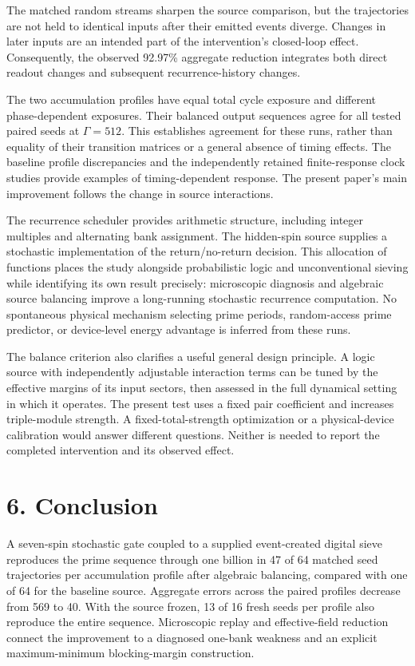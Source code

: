 \documentclass[
  11pt,
]{article}
\begin{document}
The matched random streams sharpen the source comparison, but the
trajectories are not held to identical inputs after their emitted events
diverge. Changes in later inputs are an intended part of the
intervention's closed-loop effect. Consequently, the observed 92.97\%
aggregate reduction integrates both direct readout changes and
subsequent recurrence-history changes.

The two accumulation profiles have equal total cycle exposure and
different phase-dependent exposures. Their balanced output sequences
agree for all tested paired seeds at \(\Gamma=512\). This establishes
agreement for these runs, rather than equality of their transition
matrices or a general absence of timing effects. The baseline profile
discrepancies and the independently retained finite-response clock
studies provide examples of timing-dependent response. The present
paper's main improvement follows the change in source interactions.

The recurrence scheduler provides arithmetic structure, including
integer multiples and alternating bank assignment. The hidden-spin
source supplies a stochastic implementation of the return/no-return
decision. This allocation of functions places the study alongside
probabilistic logic and unconventional sieving while identifying its own
result precisely: microscopic diagnosis and algebraic source balancing
improve a long-running stochastic recurrence computation. No spontaneous
physical mechanism selecting prime periods, random-access prime
predictor, or device-level energy advantage is inferred from these runs.

The balance criterion also clarifies a useful general design principle.
A logic source with independently adjustable interaction terms can be
tuned by the effective margins of its input sectors, then assessed in
the full dynamical setting in which it operates. The present test uses a
fixed pair coefficient and increases triple-module strength. A
fixed-total-strength optimization or a physical-device calibration would
answer different questions. Neither is needed to report the completed
intervention and its observed effect.

\section{6. Conclusion}\label{conclusion}

A seven-spin stochastic gate coupled to a supplied event-created digital
sieve reproduces the prime sequence through one billion in 47 of 64
matched seed trajectories per accumulation profile after algebraic
balancing, compared with one of 64 for the baseline source. Aggregate
errors across the paired profiles decrease from 569 to 40. With the
source frozen, 13 of 16 fresh seeds per profile also reproduce the
entire sequence. Microscopic replay and effective-field reduction
connect the improvement to a diagnosed one-bank weakness and an explicit
maximum-minimum blocking-margin construction.
\end{document}

